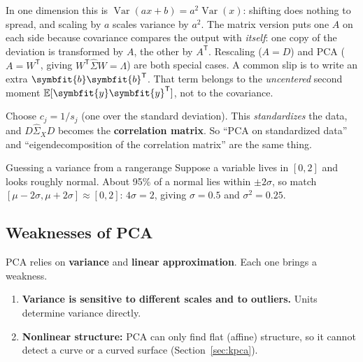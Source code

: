\documentclass[11pt]{article}
\newcommand{\bm}[1]{\symbfit{#1}}
\newcommand{\vy}{\bm{y}}
\newcommand{\Sig}{\widehat{\Sigma}}
\newcommand{\T}{^{\mathsf T}}
\begin{document}
\begin{intuition}
In one dimension this is $\operatorname{Var}(ax+b)=a^2\operatorname{Var}(x)$: shifting does nothing to spread, and
scaling by $a$ scales variance by $a^2$. The matrix version puts one $A$ on each side because
covariance compares the output with \emph{itself}: one copy of the deviation is transformed by $A$,
the other by $A\T$. Rescaling ($A=D$) and PCA ($A=W\T$, giving $W\T\Sig W=\Lambda$) are both special
cases. A common slip is to write an extra $\bm b\bm b\T$. That term belongs to the
\emph{uncentered} second moment $\mathbb E[\vy\vy\T]$, not to the covariance.
\end{intuition}

\begin{deeper}
Choose $c_j=1/s_j$ (one over the standard deviation). This \emph{standardizes} the data,
and $D\Sig_X D$ becomes the \textbf{correlation matrix}. So ``PCA on standardized data''
and ``eigendecomposition of the correlation matrix'' are the same thing.
\end{deeper}

\begin{example}{Guessing a variance from a range}{range}
Suppose a variable lives in $[0,2]$ and looks roughly normal. About 95\% of a normal
lies within $\pm2\sigma$, so match $[\mu-2\sigma,\mu+2\sigma]\approx[0,2]$:
$4\sigma=2$, giving $\sigma=0.5$ and $\sigma^2=0.25$.
\end{example}

\subsection{Weaknesses of PCA}

PCA relies on \textbf{variance} and \textbf{linear approximation}. Each one brings a weakness.
\begin{enumerate}[label=\roman*)]
\item \textbf{Variance is sensitive to different scales and to outliers.} Units determine variance directly.
\item \textbf{Nonlinear structure:} PCA can only find flat (affine) structure, so it cannot
detect a curve or a curved surface (Section~\ref{sec:kpca}).
\end{enumerate}
\end{document}
